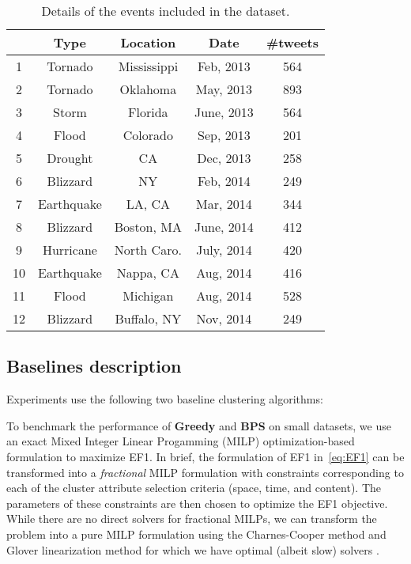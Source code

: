 \begin{table}[t]

\caption{Details of the events included in the dataset.}
\label{tbl:events}
\begin{centering}
\begin{tabular}{|c|c|c|c|c|}
\hline 
 & \textbf{Type} & \textbf{Location} & \textbf{Date} & \textbf{\#tweets}\tabularnewline
\hline 
\hline 
1 & Tornado & Mississippi & Feb, 2013 & 564\tabularnewline
\hline 
2 & Tornado & Oklahoma & May, 2013 & 893\tabularnewline
\hline 
3 & Storm & Florida & June, 2013 & 564\tabularnewline
\hline 
4 & Flood & Colorado & Sep, 2013 & 201\tabularnewline
\hline 
5 & Drought & CA & Dec, 2013 & 258\tabularnewline
\hline 
6 & Blizzard & NY & Feb, 2014 & 249 \tabularnewline
\hline 
7 & Earthquake & LA, CA & Mar, 2014 & 344\tabularnewline
\hline 
8 & Blizzard & Boston, MA & June, 2014 & 412\tabularnewline
\hline 
9 & Hurricane  & North Caro. & July, 2014 & 420\tabularnewline
\hline 
10 & Earthquake & Nappa, CA & Aug, 2014 & 416\tabularnewline
\hline 
11 & Flood & Michigan & Aug, 2014 & 528\tabularnewline
\hline 
12 & Blizzard & Buffalo, NY & Nov, 2014 & 249\tabularnewline
\hline 
\end{tabular}
\par\end{centering}
\end{table}



\subsection{Baselines description}
Experiments use the following two baseline clustering algorithms:

 To benchmark the performance of {\bf Greedy} and {\bf BPS} on small datasets, we use an exact Mixed Integer Linear Progamming (MILP) optimization-based formulation to maximize EF1. In brief, the formulation of EF1 in~\eqref{eq:EF1} can be transformed into a \emph{fractional} MILP formulation with constraints corresponding to each of the cluster attribute selection criteria (space, time, and content). The parameters of these constraints are then chosen to optimize the EF1 objective.  While there are no direct solvers for fractional MILPs, we can transform the problem into a pure MILP formulation using the Charnes-Cooper method \cite{Charnes1962} and Glover linearization method \cite{Glover1975} for which we have optimal (albeit slow) solvers .%




